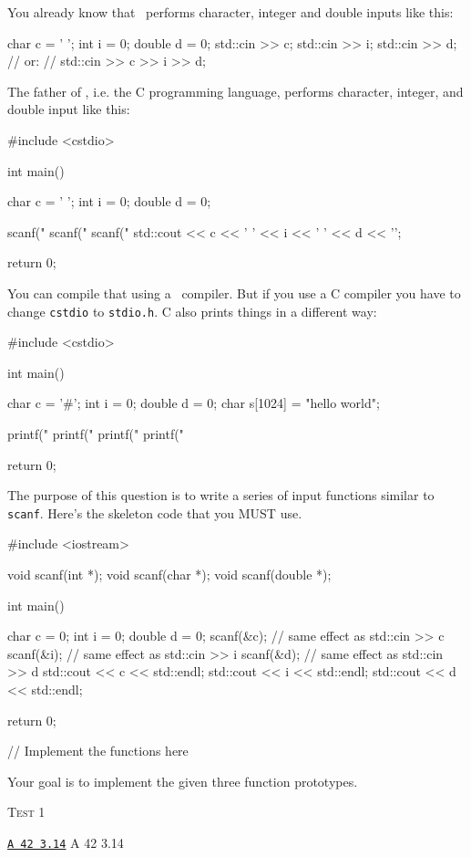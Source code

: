 You already know that \cpp\ performs character,
integer and double inputs like this:
\begin{console}
char c = ' ';
int i = 0;
double d = 0;
std::cin >> c;
std::cin >> i;
std::cin >> d;
// or:
// std::cin >> c >> i >> d;
\end{console}

The father of \cpp, i.e. the C programming language,
performs character, integer, and double input like this:
\begin{console}
#include <cstdio>

int main()
{
    char c = ' ';
    int i = 0;
    double d = 0;
    
    scanf("%
    scanf("%
    scanf("%
    std::cout << c << ' ' << i << ' ' << d << '\n';
    
    return 0;
}
\end{console}
You can compile that using a \cpp\ compiler.
But if you use a C compiler you have to change \verb!cstdio! to
\verb!stdio.h!.
C also prints things in a different way:
\begin{console}
#include <cstdio>

int main()
{
    char c = '#';
    int i = 0;
    double d = 0;
    char s[1024] = "hello world";
    
    printf("%
    printf("%
    printf("%
    printf("%
    
    return 0;
}
\end{console}

The purpose of this question is to write a series of input
functions similar to 
\verb!scanf!.
Here's the skeleton code that you MUST use.
\begin{console}[commandchars=\~\!\@]
#include <iostream>

void scanf(int *);
void scanf(char *);
void scanf(double *);

int main()
{
    char c = 0;
    int i = 0;
    double d = 0;
    scanf(&c);     // same effect as std::cin >> c
    scanf(&i);     // same effect as std::cin >> i 
    scanf(&d);     // same effect as std::cin >> d
    std::cout << c << std::endl;
    std::cout << i << std::endl;
    std::cout << d << std::endl;
    
    return 0;
}

// Implement the functions here
\end{console}

Your goal is to implement the given three function prototypes.


\textsc{Test 1}
\begin{console}[commandchars=\\\{\}]
\underline{\texttt{A 42 3.14}}
A
42
3.14
\end{console}
